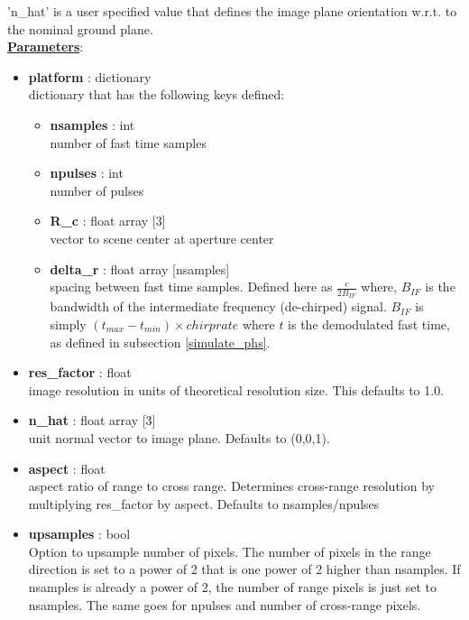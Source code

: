 \documentclass{article}
\newcommand{\defs}[2]{\textbf{{#1}} : {#2}}
\begin{document}
'n\_hat' is a user specified value that defines the image plane orientation w.r.t. to the nominal ground plane.\\

\noindent \underline{\textbf{Parameters}}:

\begin{itemize}
  	\item \defs{platform}{dictionary}\\
  	dictionary that has the following keys defined:
	\begin{itemize}
    	\item \defs{nsamples}{int}\\
    		number of fast time samples
	    \item \defs{npulses}{int}\\
	    	number of pulses
	    \item \defs{R\_c}{float array [3]}\\
	       	vector to scene center at aperture center
	    \item\defs{delta\_r}{float array [nsamples]}\\
	    	spacing between fast time samples.  Defined here as $\frac{c}{2B_{IF}}$ where, $B_{IF}$ is the bandwidth of the intermediate frequency (de-chirped) signal.  $B_{IF}$ is simply $(t_{max}-t_{min})\times chirprate$ where $t$ is the demodulated fast time, as defined in subsection \ref{simulate_phs}.
	\end{itemize}
	\item\defs{res\_factor}{float}\\
	image resolution in units of theoretical resolution size.  This defaults to 1.0.
	\item\defs{n\_hat}{float array [3]}\\
	unit normal vector to image plane.  Defaults to (0,0,1).
	\item\defs{aspect}{float}\\
	aspect ratio of range to cross range.  Determines cross-range resolution by multiplying res\_factor by aspect.  Defaults to nsamples/npulses
	\item\defs{upsamples}{bool}\\
	Option to upsample number of pixels.  The number of pixels in the range direction is set to a power of 2 that is one power of 2 higher than nsamples.  If nsamples is already a power of 2, the number of range pixels is just set to nsamples.  The same goes for npulses and number of cross-range pixels. 
	
\end{itemize}
\end{document}
